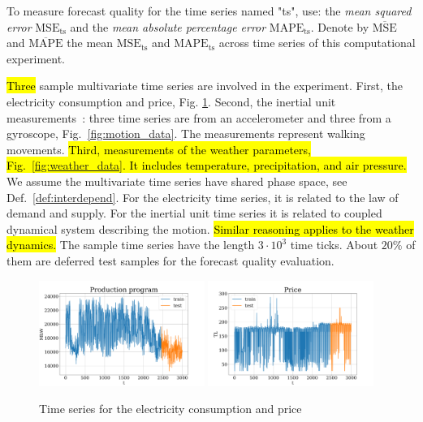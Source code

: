 \documentclass[referee, pdflatex, sn-mathphys-num]{sn-jnl}
\theoremstyle{definition}
\theoremstyle{plain}
\begin{document}
	To measure forecast quality for the time series named "ts", use: the \emph{mean squared error} $ \text{MSE}_{\text{ts}} $ and the \emph{mean absolute percentage error} $ \text{MAPE}_{\text{ts}} $. Denote by $ \overline{\text{MSE}} $ and $ \overline{\text{MAPE}} $ the mean $ \text{MSE}_{\text{ts}} $ and $ \text{MAPE}_{\text{ts}} $ across time series of this computational experiment.
	
	\hl{Three} sample multivariate time series are involved in the experiment. First, the electricity consumption and price, Fig. \ref{fig:electr_data}. Second, the inertial unit measurements~\cite{accelerometryData}: three time series are from an accelerometer and three from a gyroscope, Fig.~\ref{fig:motion_data}. The measurements represent walking movements. \hl{Third, measurements of the weather parameters, Fig.~{\ref{fig:weather_data}}. It includes temperature, precipitation, and air pressure.}  We assume the multivariate time series have shared phase space, see Def.~\ref{def:interdepend}. For the electricity time series, it is related to the law of demand and supply. For the inertial unit time series it is related to coupled dynamical system describing the motion. \hl{Similar reasoning applies to the weather dynamics.} The sample time series have the length $ 3 \cdot 10^3 $ time ticks. About $ 20\% $ of them are deferred test samples for the forecast quality evaluation.
	
	\begin{figure}[!htbp]
		\centering
		\includegraphics[width=0.48\textwidth, keepaspectratio]{Electricity_Production}
		\includegraphics[width=0.48\textwidth, keepaspectratio]{Electricity_Price}
		\caption{Time series for the electricity consumption and price}\label{fig:electr_data}
	\end{figure}
	
\end{document}
